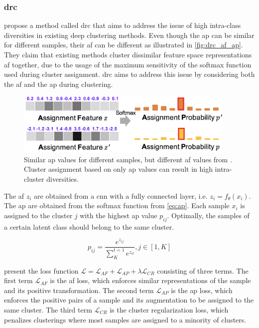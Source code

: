 \subsubsection{\ac{drc}}\label{subsubsec:drc}

\citet{DRC_2020} propose a method called \ac{drc} 
that aims to address the issue of high intra-class diversities in existing deep clustering methods.
Even though the \ac{ap} can be similar for different samples, their \ac{af} can be different 
as illustrated in \autoref{fig:drc_af_ap}.
They claim that existing methods cluster dissimilar feature space representations \ac{af} together,
due to the usage of the maximum sensitivity of the softmax function used during cluster assignment.
\ac{drc} aims to address this issue by considering both the \ac{af} and the \ac{ap} during clustering.

\begin{figure}[h] %
    \centering
    \includegraphics[width=300pt]{images/DRC_af_ap.png}
    \caption{Similar \ac{ap} values for different samples, but different \ac{af} values from \citet{DRC_2020}.
    Cluster assignment based on only \ac{ap} values can result in high intra-cluster diversities.}
    \label{fig:drc_af_ap}
\end{figure}

The \ac{af} $z_i$ are obtained from a \ac{cnn} with a fully connected layer, i.e. $z_i = f_\theta(x_i)$.
The \ac{ap} are obtained from the softmax function from \eqref{eq:ap}. 
Each sample $x_i$ is assigned to the cluster $j$ with the highest \ac{ap} value $p_{ij}$.
Optimally, the samples of a certain latent class should belong to the same cluster.

\begin{equation}
    p_{ij} = \frac{e^{z_{ij}}}{\sum_{K}^{t=1}e^{z_{it}}}, j \in \left[1,K\right]
    \label{eq:ap}
\end{equation}

\citeauthor{DRC_2020} present the loss function $\mathcal{L} = \mathcal{L}_{AF} + \mathcal{L}_{AP}  + \lambda \mathcal{L}_{CR}$  consisting of three terms.
The first term $\mathcal{L}_{AF}$ is the \ac{af} loss, which enforces similar representations of the sample and its positive transformation.
The second term $\mathcal{L}_{AP}$ is the \ac{ap} loss, which enforces the positive pairs of a sample and its augmentation 
to be assigned to the same cluster.
The third term $\mathcal{L}_{CR}$ is the cluster regularization loss, which penalizes clusterings where most samples are assigned to a minority of clusters.